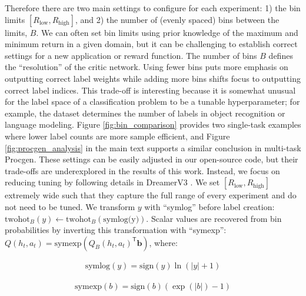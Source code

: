 Therefore there are two main settings to configure for each experiment: 1) the bin limits $[R_\text{low}, R_\text{high}]$, and 2) the number of (evenly spaced) bins between the limits, $B$. We can often set bin limits using prior knowledge of the maximum and minimum return in a given domain, but it can be challenging to establish correct settings for a new application or reward function. The number of bins $B$ defines the ``resolution'' of the critic network. Using fewer bins puts more emphasis on outputting correct label weights while adding more bins shifts focus to outputting correct label indices. This trade-off is interesting because it is somewhat unusual for the label space of a classification problem to be a tunable hyperparameter; for example, the dataset determines the number of labels in object recognition or language modeling. Figure \ref{fig:bin_comparison} provides two single-task examples where lower label counts are more sample efficient, and Figure \ref{fig:procgen_analysis} in the main text supports a similar conclusion in multi-task Procgen. These settings can be easily adjusted in our open-source code, but their trade-offs are underexplored in the results of this work. Instead, we focus on reducing tuning by following details in DreamerV3 \cite{hafner2023mastering}. We set $[R_\text{low}, R_\text{high}]$ extremely wide such that they capture the full range of every experiment and do not need to be tuned. We transform $y$ with ``symlog'' before label creation:
$\text{twohot}_B(y) \leftarrow \text{twohot}_B(\text{symlog(y)})$. Scalar values are recovered from bin probabilities by inverting this transformation with ``symexp'': $Q(h_t, a_t) = \text{symexp}(Q_B(h_t, a_t)^\mathsf{T}\mathbf{b})$, where:

\begin{minipage}{0.45\textwidth}
  \begin{align}
    \text{symlog}(y) = \text{sign}(y) \ln(|y| + 1)
    \end{align}
\end{minipage}
\begin{minipage}{0.45\textwidth}
    \begin{align}
    \text{symexp}(b) = \text{sign}(b) (\exp(|b|) - 1)
    \end{align}
\end{minipage}



